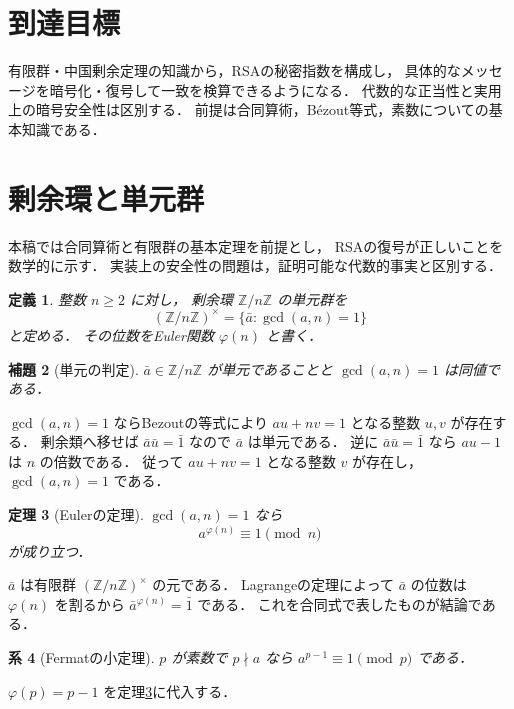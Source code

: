 \documentclass[a5paper,10pt,onecolumn]{jsarticle}
\makeatletter
\theoremstyle{mathnotetheorem}
\newtheorem{theorem}{定理}[section]
\newtheorem{definition}[theorem]{定義}
\newtheorem{lemma}[theorem]{補題}
\newtheorem{corollary}[theorem]{系}
\renewcommand{\proofname}{証明}
\renewenvironment{proof}[1][\proofname]{%
  \par\pushQED{\qed}\normalfont\topsep4\p@\@plus2\p@\relax
  \trivlist\item[\hskip\labelsep\bfseries #1]\ignorespaces
}{\popQED\endtrivlist\@endpefalse}
\makeatother
\begin{document}
\section*{到達目標}
有限群・中国剰余定理の知識から，RSAの秘密指数を構成し，
具体的なメッセージを暗号化・復号して一致を検算できるようになる．
代数的な正当性と実用上の暗号安全性は区別する．
前提は合同算術，B\'ezout等式，素数についての基本知識である．


\section{剰余環と単元群}

本稿では合同算術と有限群の基本定理を前提とし，
RSAの復号が正しいことを数学的に示す．
実装上の安全性の問題は，証明可能な代数的事実と区別する．

\begin{definition}
整数 $n\ge2$ に対し，
剰余環 $\mathbb Z/n\mathbb Z$ の\emph{単元群}を
\[
 (\mathbb Z/n\mathbb Z)^\times
 =\{\bar a:\gcd(a,n)=1\}
\]
と定める．
その位数をEuler関数 $\varphi(n)$ と書く．
\end{definition}

\begin{lemma}[単元の判定]\label{lem:units}
$\bar a\in\mathbb Z/n\mathbb Z$ が単元であることと
$\gcd(a,n)=1$ は同値である．
\end{lemma}
\begin{proof}
$\gcd(a,n)=1$ ならBezoutの等式により
$au+nv=1$ となる整数 $u,v$ が存在する．
剰余類へ移せば $\bar a\bar u=\bar1$ なので
$\bar a$ は単元である．
逆に $\bar a\bar u=\bar1$ なら
$au-1$ は $n$ の倍数である．
従って $au+nv=1$ となる整数 $v$ が存在し，
$\gcd(a,n)=1$ である．
\end{proof}

\begin{theorem}[Eulerの定理]\label{thm:euler}
$\gcd(a,n)=1$ なら
\[
 a^{\varphi(n)}\equiv1\pmod n
\]
が成り立つ．
\end{theorem}
\begin{proof}
$\bar a$ は有限群
$(\mathbb Z/n\mathbb Z)^\times$ の元である．
Lagrangeの定理によって $\bar a$ の位数は
$\varphi(n)$ を割るから
$\bar a^{\varphi(n)}=\bar1$ である．
これを合同式で表したものが結論である．
\end{proof}

\begin{corollary}[Fermatの小定理]\label{cor:fermat}
$p$ が素数で $p\nmid a$ なら
$a^{p-1}\equiv1\pmod p$ である．
\end{corollary}
\begin{proof}
$\varphi(p)=p-1$ を定理\ref{thm:euler}に代入する．
\end{proof}
\end{document}
